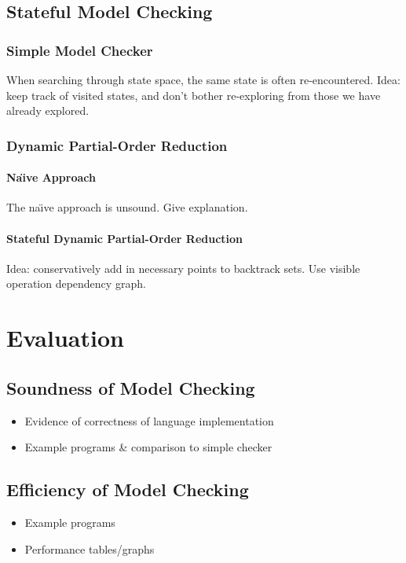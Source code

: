 \documentclass[12pt,a4paper,twoside,openright]{report}
\begin{document}
\section{Stateful Model Checking}

\subsection{Simple Model Checker}
When searching through state space, the same state is often
re-encountered. Idea: keep track of visited states, and don't bother
re-exploring from those we have already explored.

\subsection{Dynamic Partial-Order Reduction}

\subsubsection{Na\"{\i}ve Approach}
The na\"{\i}ve approach is unsound.
Give explanation.

\subsubsection{Stateful Dynamic Partial-Order Reduction}
Idea: conservatively add in necessary points to backtrack sets.
Use visible operation dependency graph.

\chapter{Evaluation}

\section{Soundness of Model Checking}

\begin{itemize}
	\item Evidence of correctness of language implementation
	\item Example programs \& comparison to simple checker
\end{itemize}

\section{Efficiency of Model Checking}

\begin{itemize}
	\item Example programs
	\item Performance tables/graphs
\end{itemize}
\end{document}

